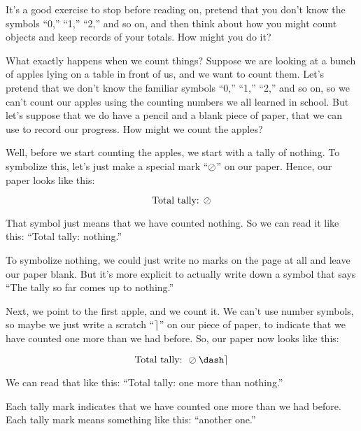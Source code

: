 \documentclass[../../../main.tex]{subfiles}
\begin{document}
\begin{ponder}
  It's a good exercise to stop before reading on, pretend that you don't know the symbols ``0,'' ``1,'' ``2,'' and so on, and then think about how you might count objects and keep records of your totals. How might you do it? 
\end{ponder}

What exactly happens when we count things? Suppose we are looking at a bunch of apples lying on a table in front of us, and we want to count them. Let's pretend that we don't know the familiar symbols ``0,'' ``1,'' ``2,'' and so on, so we can't count our apples using the counting numbers we all learned in school. But let's suppose that we do have a pencil and a blank piece of paper, that we can use to record our progress. How might we count the apples?

Well, before we start counting the apples, we start with a tally of nothing. To symbolize this, let's just make a special mark ``$\nought/$'' on our paper. Hence, our paper looks like this:

\begin{equation*}
  \text{Total tally: } \nought/
\end{equation*}

That symbol just means that we have counted nothing. So we can read it like this: ``Total tally: nothing.''

\begin{aside}
  \begin{remark}
    To symbolize nothing, we could just write no marks on the page at all and leave our paper blank. But it's more explicit to actually write down a symbol that says ``The tally so far comes up to nothing.''
  \end{remark}
\end{aside}

Next, we point to the first apple, and we count it. We can't use number symbols, so maybe we just write a scratch ``$\tally/$'' on our piece of paper, to indicate that we have counted one more than we had before. So, our paper now looks like this:

\begin{equation*}
  \text{Total tally: } \nought/\dash\tally/
\end{equation*}

We can read that like this: ``Total tally: one more than nothing.''

\begin{aside}
  \begin{remark}
    Each tally mark indicates that we have counted one more than we had before. Each tally mark means something like this: ``another one.''
  \end{remark}
\end{aside}
\end{document}
